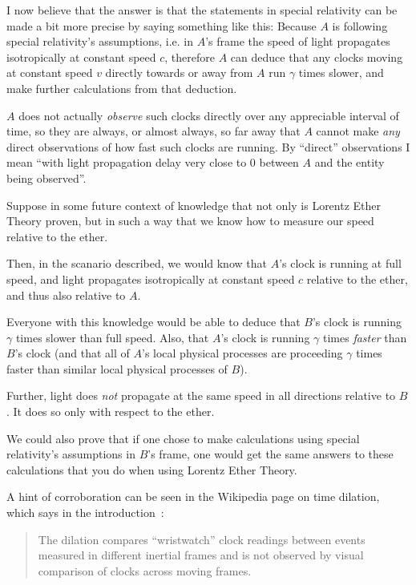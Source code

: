 \documentclass[a4paper]{article}
\theoremstyle{plain}
\theoremstyle{definition}
\begin{document}
I now believe that the answer is that the statements in special
relativity can be made a bit more precise by saying something like
this: Because $A$ is following special relativity's assumptions,
i.e. in $A$'s frame the speed of light propagates isotropically at
constant speed $c$, therefore $A$ can deduce that any clocks moving at
constant speed $v$ directly towards or away from $A$ run $\gamma$
times slower, and make further calculations from that deduction.

$A$ does not actually {\em observe} such clocks directly over any
appreciable interval of time, so they are always, or almost always, so
far away that $A$ cannot make {\em any} direct observations of how
fast such clocks are running.  By ``direct'' observations I mean
``with light propagation delay very close to 0 between $A$ and the
entity being observed''.

Suppose in some future context of knowledge that not only is Lorentz
Ether Theory proven, but in such a way that we know how to measure our
speed relative to the ether.

Then, in the scanario described, we would know that $A$'s clock is
running at full speed, and light propagates isotropically at constant
speed $c$ relative to the ether, and thus also relative to $A$.

Everyone with this knowledge would be able to deduce that $B$'s clock
is running $\gamma$ times slower than full speed.  Also, that
$A$'s clock is running $\gamma$ times {\em faster} than $B$'s clock
(and that all of $A$'s local physical processes are proceeding
$\gamma$ times faster than similar local physical processes of $B$).

Further, light does {\em not} propagate at the same speed in all
directions relative to $B$.  It does so only with respect to the
ether.

We could also prove that if one chose to make calculations using
special relativity's assumptions in $B$'s frame, one would get the
same answers to these calculations that you do when using Lorentz
Ether Theory.

A hint of corroboration can be seen in the Wikipedia page on time
dilation, which says in the introduction~\cite{WikipediaTimeDilation}:
\begin{quote}
The dilation compares ``wristwatch'' clock readings between events
measured in different inertial frames and is not observed by visual
comparison of clocks across moving frames.
\end{quote}
\end{document}
